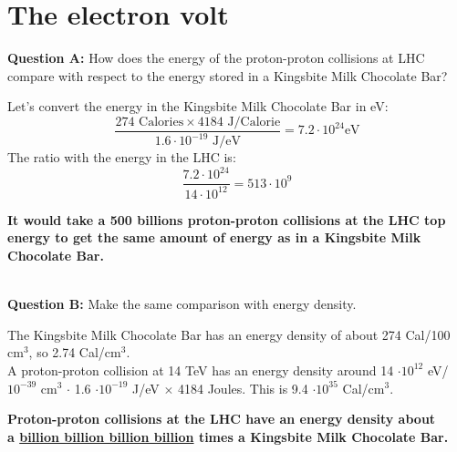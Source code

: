\documentclass[12pt]{article}
\begin{document}
\section{The electron volt}
% 
% 


\textbf{Question A:} How does the energy of the proton-proton collisions at LHC compare with respect to the energy stored in a Kingsbite Milk Chocolate Bar?\\ 

{\color{blue}

Let's convert the energy in the Kingsbite Milk Chocolate Bar in eV:
\begin{equation}
 \frac{ 274 \text{ Calories} \times 4184 \text{ J/Calorie} }{ 1.6 \cdot 10^{-19} \text{ J/eV}} = 7.2 \cdot 10^{24} \text{eV}
\end{equation}
The ratio with the energy in the LHC is:
\begin{equation}
 \frac{7.2 \cdot 10^{24}}{14 \cdot 10^{12}} = 513 \cdot 10^{9}
\end{equation}

\textbf{It would take a 500 billions proton-proton collisions at the LHC top energy to get the same amount of energy as in a Kingsbite Milk Chocolate Bar.}
}\\

\textbf{Question B:} Make the same comparison with energy density.\\

{\color{blue}
The Kingsbite Milk Chocolate Bar has an energy density of about 274 Cal/100 cm$^3$, so 2.74 Cal/cm$^3$.\\
A proton-proton collision at 14 TeV has an energy density around 14 $\cdot 10^{12}$ eV/$10^{-39}$ cm$^3$ $\cdot$ 1.6 $\cdot 10^{-19}$ J/eV $\times$ 4184 Joules. This is 9.4 $\cdot 10^{35}$ Cal/cm$^3$.\\

\begin{center}
\textbf{Proton-proton collisions at the LHC have an energy density about \\a \underline{billion billion billion billion} times a Kingsbite Milk Chocolate Bar.}\end{center}
}
    
\end{document}
